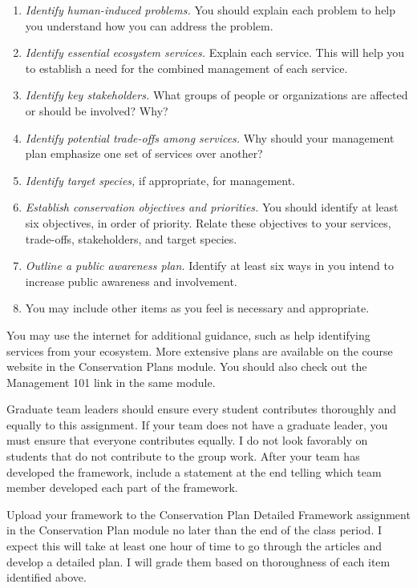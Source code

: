 \documentclass[12pt, hidelinks]{exam}
\begin{document}
\begin{enumerate}[leftmargin=*, label=\Alph*.]

	\item \emph{Identify human-induced problems.} You should explain each problem to help you understand how you can address the problem.
	
	\item \emph{Identify essential ecosystem services.} Explain each service. This will help you to establish a need for the combined management of each service.
	
	\item \emph{Identify key stakeholders.} What groups of people or organizations are affected or should be involved? Why?
	
	\item \emph{Identify potential trade-offs among services.} Why should your management plan emphasize one set of services over another? 
	
	\item \emph{Identify target species,} if appropriate, for management.

	\item \emph{Establish conservation objectives and priorities.} You should identify at least six objectives, in order of priority. Relate these objectives to your services, trade-offs, stakeholders, and target species.
	
	\item \emph{Outline a public awareness plan.} Identify at least six ways in you intend to increase public awareness and involvement.
	
	\item You may include other items as you feel is necessary and appropriate.
	
\end{enumerate}

You may use the internet for additional guidance, such as help identifying services from your ecosystem. More extensive plans are available on the course website in the Conservation Plans module. You should also check out the Management 101 link in the same module.

Graduate team leaders should ensure every student contributes thoroughly and equally to this assignment. If your team does not have a graduate leader, you must ensure that everyone contributes equally. I do not look favorably on students that do not contribute to the group work. After your team has developed the framework, include a statement at the end telling which team member developed each part of the framework. 

Upload your framework to the Conservation Plan Detailed Framework assignment in the Conservation Plan module no later than the end of the class period. I expect this will take at least one hour of time to go through the articles and develop a detailed plan. I will grade them based on thoroughness of each item identified above.
\end{document}
